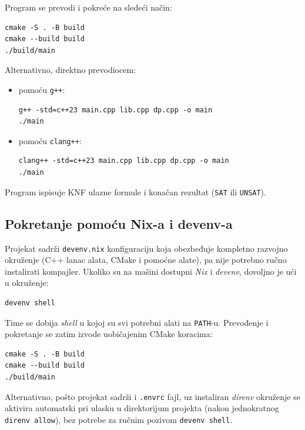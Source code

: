 \documentclass[a4paper,10pt]{article}
\begin{document}
Program se prevodi i pokreće na sledeći način:

\begin{verbatim}
cmake -S . -B build
cmake --build build
./build/main
\end{verbatim} 

\newpage
Alternativno, direktno prevodiocem:

\begin{itemize}
  \item pomoću \verb|g++|:
\begin{verbatim}
g++ -std=c++23 main.cpp lib.cpp dp.cpp -o main
./main
\end{verbatim}

  \item pomoću \verb|clang++|:
\begin{verbatim}
clang++ -std=c++23 main.cpp lib.cpp dp.cpp -o main
./main
\end{verbatim}
\end{itemize}

Program ispisuje KNF ulazne formule i konačan rezultat (\verb|SAT| ili \verb|UNSAT|).

\subsection{Pokretanje pomoću Nix-a i devenv-a}\label{subsec:nix}

Projekat sadrži \verb|devenv.nix| konfiguraciju koja obezbeđuje kompletno
razvojno okruženje (C++ lanac alata, CMake i pomoćne alate), pa nije
potrebno ručno instalirati kompajler. Ukoliko su na mašini dostupni
\emph{Nix} i \emph{devenv}, dovoljno je ući u okruženje:

\begin{verbatim}
devenv shell
\end{verbatim}

\noindent Time se dobija \emph{shell} u kojoj su svi potrebni alati na \verb|PATH|-u. Prevođenje i pokretanje se zatim izvode uobičajenim CMake koracima:

\begin{verbatim}
cmake -S . -B build
cmake --build build
./build/main
\end{verbatim}

\noindent Alternativno, pošto projekat sadrži i \verb|.envrc| fajl, uz
instaliran \emph{direnv} okruženje se aktivira automatski pri ulasku u
direktorijum projekta (nakon jednokratnog \verb|direnv allow|), bez
potrebe za ručnim pozivom \verb|devenv shell|.
\end{document}
